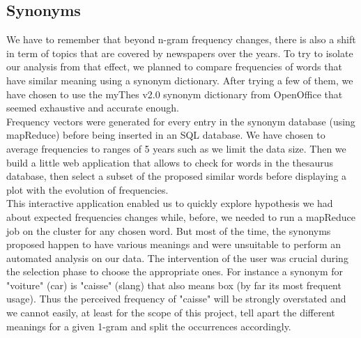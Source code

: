 \subsection{Synonyms}

We have to remember that beyond n-gram frequency changes, there is also a shift in term of topics that are covered by newspapers over the years. To try to isolate our analysis from that effect, we planned to compare frequencies of words that have similar meaning using a synonym dictionary. After trying a few of them, we have chosen to use the myThes v2.0 synonym dictionary from OpenOffice that seemed exhaustive and accurate enough. \\

Frequency vectors were generated for every entry in the synonym database (using mapReduce) before being inserted in an SQL database. We have chosen to average frequencies to ranges of 5 years such as we limit the data size. Then we build a little web application that allows to check for words in the thesaurus database, then select a subset of the proposed similar words before displaying a plot with the evolution of frequencies.\\

This interactive application enabled us to quickly explore hypothesis we had about expected frequencies changes while, before, we needed to run a mapReduce job on the cluster for any chosen word. But most of the time, the synonyms proposed happen to have various meanings and were unsuitable to perform an automated analysis on our data. The intervention of the user was crucial during the selection phase to choose the appropriate ones. For instance a synonym for "voiture" (car) is "caisse" (slang) that also means box (by far its most frequent usage). Thus the perceived frequency of "caisse" will be strongly overstated and we cannot easily, at least for the scope of this project, tell apart the different meanings for a given 1-gram and split the occurrences accordingly.

